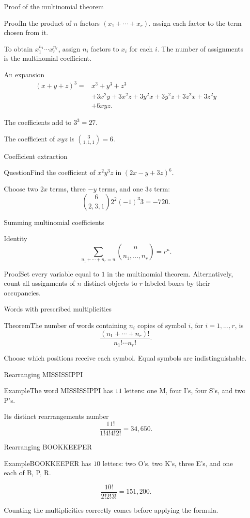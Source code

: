 \documentclass[aspectratio=169,11pt]{beamer}
\newcommand{\Thm}[2]{\begin{block}{#1}#2\end{block}}
\renewcommand{\Proof}[1]{\begin{block}{Proof}\normalsize #1\end{block}}
\newcommand{\Question}[1]{\begin{block}{Question}#1\end{block}}
\renewcommand{\Example}[1]{\begin{block}{Example}#1\end{block}}
\newcommand{\gap}{\par\medskip}
\begin{document}
\begin{frame}{Proof of the multinomial theorem}
\large
\Proof{In the product of $n$ factors $(x_1+\cdots+x_r)$, assign each factor to the term chosen from it.\gap To obtain $x_1^{n_1}\cdots x_r^{n_r}$, assign $n_i$ factors to $x_i$ for each $i$. The number of assignments is the multinomial coefficient.}
\end{frame}
\begin{frame}{An expansion}
\large
\normalsize
\begin{align*}
(x+y+z)^3={}&x^3+y^3+z^3\\
&+3x^2y+3x^2z+3y^2x+3y^2z+3z^2x+3z^2y\\
&+6xyz.
\end{align*}
\gap The coefficients add to $3^3=27$.
\gap The coefficient of $xyz$ is $\binom3{1,1,1}=6$.
\end{frame}
\begin{frame}{Coefficient extraction}
\large
\Question{Find the coefficient of $x^2y^3z$ in $(2x-y+3z)^6$.}
\gap Choose two $2x$ terms, three $-y$ terms, and one $3z$ term:
\[\binom6{2,3,1}2^2(-1)^3 3=-720.\]
\end{frame}
\begin{frame}{Summing multinomial coefficients}
\large
\Thm{Identity}{\[\sum_{n_1+\cdots+n_r=n}\binom n{n_1,\ldots,n_r}=r^n.\]}
\Proof{Set every variable equal to $1$ in the multinomial theorem. Alternatively, count all assignments of $n$ distinct objects to $r$ labeled boxes by their occupancies.}
\end{frame}
\begin{frame}{Words with prescribed multiplicities}
\large
\Thm{Theorem}{The number of words containing $n_i$ copies of symbol $i$, for $i=1,\ldots,r$, is
\[\frac{(n_1+\cdots+n_r)!}{n_1!\cdots n_r!}.\]}
\gap Choose which positions receive each symbol. Equal symbols are indistinguishable.
\end{frame}
\begin{frame}{Rearranging MISSISSIPPI}
\large
\Example{The word MISSISSIPPI has $11$ letters: one M, four I's, four S's, and two P's.}
\gap Its distinct rearrangements number
\[\frac{11!}{1!4!4!2!}=34,650.\]
\end{frame}
\begin{frame}{Rearranging BOOKKEEPER}
\large
\Example{BOOKKEEPER has $10$ letters: two O's, two K's, three E's, and one each of B, P, R.}
\[\frac{10!}{2!2!3!}=151,200.\]
\gap Counting the multiplicities correctly comes before applying the formula.
\end{frame}
\end{document}
